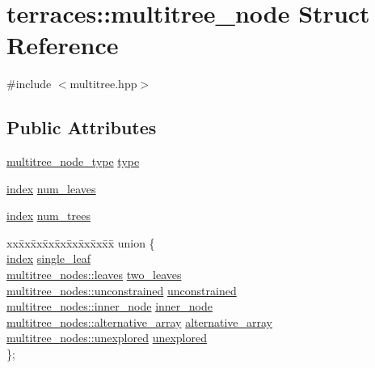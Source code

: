 \hypertarget{structterraces_1_1multitree__node}{}\section{terraces\+:\+:multitree\+\_\+node Struct Reference}
\label{structterraces_1_1multitree__node}


{\ttfamily \#include $<$multitree.\+hpp$>$}

\subsection*{Public Attributes}
\begin{DoxyCompactItemize}
\item 
\hyperlink{namespaceterraces_ae1e4987c27eddd3b87041a2f0479bcc1}{multitree\+\_\+node\+\_\+type} \hyperlink{structterraces_1_1multitree__node_a49438e92b6f5d03d2c4b80ca5c22e42b}{type}
\item 
\hyperlink{namespaceterraces_adbc33ccb543d1634e96d0eb02e472c77}{index} \hyperlink{structterraces_1_1multitree__node_ace2659eccbb66c8e71fb0877ac928089}{num\+\_\+leaves}
\item 
\hyperlink{namespaceterraces_adbc33ccb543d1634e96d0eb02e472c77}{index} \hyperlink{structterraces_1_1multitree__node_af0b36c02c0d3f1bdfc1474f6b5645034}{num\+\_\+trees}
\item 
\begin{tabbing}
xx\=xx\=xx\=xx\=xx\=xx\=xx\=xx\=xx\=\kill
union \{\\
\>\hyperlink{namespaceterraces_adbc33ccb543d1634e96d0eb02e472c77}{index} \hyperlink{structterraces_1_1multitree__node_a42cab323fcce0666f889f42f8a4aad3b}{single\_leaf}\\
\>\hyperlink{structterraces_1_1multitree__nodes_1_1leaves}{multitree\_nodes::leaves} \hyperlink{structterraces_1_1multitree__node_a1794eff370e917ad66d77f4c3d2bdbe2}{two\_leaves}\\
\>\hyperlink{structterraces_1_1multitree__nodes_1_1unconstrained}{multitree\_nodes::unconstrained} \hyperlink{structterraces_1_1multitree__node_a32b2c2ac8728878efc5d050f10e398e1}{unconstrained}\\
\>\hyperlink{structterraces_1_1multitree__nodes_1_1inner__node}{multitree\_nodes::inner\_node} \hyperlink{structterraces_1_1multitree__node_aff5f84783751a9bb71680877efde2aa2}{inner\_node}\\
\>\hyperlink{structterraces_1_1multitree__nodes_1_1alternative__array}{multitree\_nodes::alternative\_array} \hyperlink{structterraces_1_1multitree__node_acffb9280cbec2b7bc4595f5e73b27fdc}{alternative\_array}\\
\>\hyperlink{structterraces_1_1multitree__nodes_1_1unexplored}{multitree\_nodes::unexplored} \hyperlink{structterraces_1_1multitree__node_a960b794604e1a306f8667fd021507a3b}{unexplored}\\
\}; \\

\end{tabbing}\end{DoxyCompactItemize}


